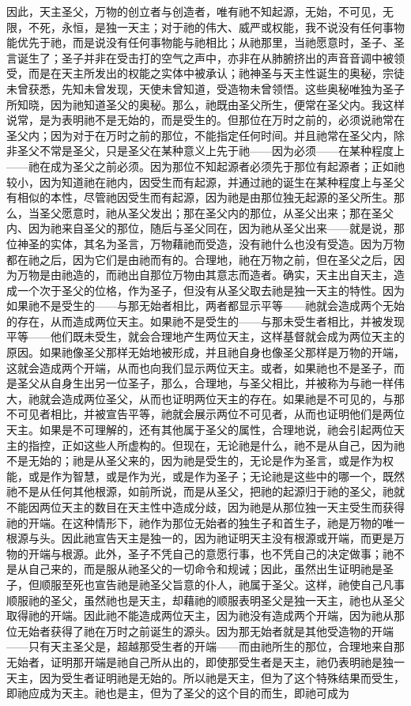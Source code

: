 因此，天主圣父，万物的创立者与创造者，唯有祂不知起源，无始，不可见，无限，不死，永恒，是独一天主；对于祂的伟大、威严或权能，我不说没有任何事物能优先于祂，而是说没有任何事物能与祂相比；从祂那里，当祂愿意时，圣子、圣言诞生了；圣子并非在受击打的空气之声中，亦非在从肺腑挤出的声音音调中被领受，而是在天主所发出的权能之实体中被承认；祂神圣与天主性诞生的奥秘，宗徒未曾获悉，先知未曾发现，天使未曾知道，受造物未曾领悟。这些奥秘唯独为圣子所知晓，因为祂知道圣父的奥秘。那么，祂既由圣父所生，便常在圣父内。我这样说常，是为表明祂不是无始的，而是受生的。但那位在万时之前的，必须说祂常在圣父内；因为对于在万时之前的那位，不能指定任何时间。并且祂常在圣父内，除非圣父不常是圣父，只是圣父在某种意义上先于祂——因为必须——在某种程度上——祂在成为圣父之前必须。因为那位不知起源者必须先于那位有起源者；正如祂较小，因为知道祂在祂内，因受生而有起源，并通过祂的诞生在某种程度上与圣父有相似的本性，尽管祂因受生而有起源，因为祂是由那位独无起源的圣父所生。那么，当圣父愿意时，祂从圣父发出；那在圣父内的那位，从圣父出来；那在圣父内、因为祂来自圣父的那位，随后与圣父同在，因为祂从圣父出来——就是说，那位神圣的实体，其名为圣言，万物藉祂而受造，没有祂什么也没有受造。因为万物都在祂之后，因为它们是由祂而有的。合理地，祂在万物之前，但在圣父之后，因为万物是由祂造的，而祂出自那位万物由其意志而造者。确实，天主出自天主，造成一个次于圣父的位格，作为圣子，但没有从圣父取去祂是独一天主的特性。因为如果祂不是受生的——与那无始者相比，两者都显示平等——祂就会造成两个无始的存在，从而造成两位天主。如果祂不是受生的——与那未受生者相比，并被发现平等——他们既未受生，就会合理地产生两位天主，这样基督就会成为两位天主的原因。如果祂像圣父那样无始地被形成，并且祂自身也像圣父那样是万物的开端，这就会造成两个开端，从而也向我们显示两位天主。或者，如果祂也不是圣子，而是圣父从自身生出另一位圣子，那么，合理地，与圣父相比，并被称为与祂一样伟大，祂就会造成两位圣父，从而也证明两位天主的存在。如果祂是不可见的，与那不可见者相比，并被宣告平等，祂就会展示两位不可见者，从而也证明他们是两位天主。如果是不可理解的，还有其他属于圣父的属性，合理地说，祂会引起两位天主的指控，正如这些人所虚构的。但现在，无论祂是什么，祂不是从自己，因为祂不是无始的；祂是从圣父来的，因为祂是受生的，无论是作为圣言，或是作为权能，或是作为智慧，或是作为光，或是作为圣子；无论祂是这些中的哪一个，既然祂不是从任何其他根源，如前所说，而是从圣父，把祂的起源归于祂的圣父，祂就不能因两位天主的数目在天主性中造成分歧，因为祂是从那位独一天主受生而获得祂的开端。在这种情形下，祂作为那位无始者的独生子和首生子，祂是万物的唯一根源与头。因此祂宣告天主是独一的，因为祂证明天主没有根源或开端，而更是万物的开端与根源。此外，圣子不凭自己的意愿行事，也不凭自己的决定做事；祂不是从自己来的，而是服从祂圣父的一切命令和规诫；因此，虽然出生证明祂是圣子，但顺服至死也宣告祂是祂圣父旨意的仆人，祂属于圣父。这样，祂使自己凡事顺服祂的圣父，虽然祂也是天主，却藉祂的顺服表明圣父是独一天主，祂也从圣父取得祂的开端。因此祂不能造成两位天主，因为祂没有造成两个开端，因为祂从那位无始者获得了祂在万时之前诞生的源头。因为那无始者就是其他受造物的开端——只有天主圣父是，超越那受生者的开端——而由祂所生的那位，合理地来自那无始者，证明那开端是祂自己所从出的，即使那受生者是天主，祂仍表明祂是独一天主，因为受生者证明祂是无始的。所以祂是天主，但为了这个特殊结果而受生，即祂应成为天主。祂也是主，但为了圣父的这个目的而生，即祂可成为